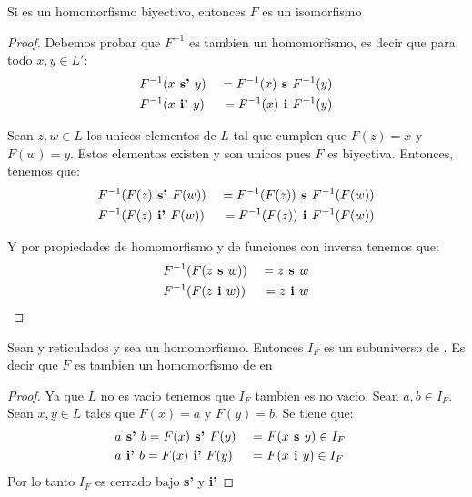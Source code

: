 \begin{lemma}
  Si  es un homomorfismo biyectivo,
  entonces $F$ es un isomorfismo
\end{lemma}
\begin{proof}
  Debemos probar que $F^{-1}$ es tambien un homomorfismo, es decir que para todo $x, y \in L'$:
  \begin{alignat*}{2}
    &F^{-1}(x \textbf{ s' }y) &\ = F^{-1}(x)\textbf{ s }F^{-1}(y)\\
    &F^{-1}(x \textbf{ i' }y) &\ = F^{-1}(x)\textbf{ i }F^{-1}(y)\\    
  \end{alignat*}

  Sean $z, w \in L$ los unicos elementos de $L$ tal que cumplen que $F(z) = x$ y $F(w) = y$. Estos elementos
  existen y son unicos pues $F$ es biyectiva. Entonces, tenemos que:
  \begin{alignat*}{2}
    &F^{-1}(F(z) \textbf{ s' }F(w)) &\ = F^{-1}(F(z))\textbf{ s }F^{-1}(F(w))\\
    &F^{-1}(F(z) \textbf{ i' }F(w)) &\ = F^{-1}(F(z))\textbf{ i }F^{-1}(F(w))\\    
  \end{alignat*}

  Y por propiedades de homomorfismo y de funciones con inversa tenemos que:
  \begin{alignat*}{2}
    &F^{-1}(F(z\textbf{ s }w)) &\ = z\textbf{ s }w\\
    &F^{-1}(F(z\textbf{ i }w)) &\ = z\textbf{ i }w\\    
  \end{alignat*}
\end{proof}
\begin{lemma}
  Sean \reticulAlg y  reticulados y sea 
  un homomorfismo. Entonces $I_F$ es un subuniverso de . Es decir que $F$
  es tambien un homomorfismo de \reticulAlg en 
\end{lemma}
\begin{proof}
  Ya que $L$ no es vacio tenemos que $I_F$ tambien es no vacio. Sean $a, b \in I_F$. Sean $x, y \in L$ tales que $F(x) = a$ y $F(y) = b$.
  Se tiene que:
  \begin{alignat*}{3}
    &a \textbf{ s' }b = F(x) \textbf{ s' } F(y) &\ =&\ F(\supbin{x}{y}) \in I_F&\\
    &a \textbf{ i' }b = F(x) \textbf{ i' } F(y) &\ =&\ F(\infbin{x}{y}) \in I_F&
  \end{alignat*}
  Por lo tanto $I_F$ es cerrado bajo \textbf{ s' } y \textbf{ i' }
\end{proof}
